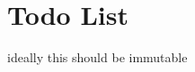 \chapter{Todo List}
\hypertarget{todo}{}\label{todo}

\begin{DoxyRefList}
\item[Struct \doxylink{structNeoN_1_1la_1_1SparsityView}{NeoN\+::la\+::Sparsity\+View\texorpdfstring{$<$}{<} Index\+Type \texorpdfstring{$>$}{>}} ]\label{todo__todo000001}%
%
ideally this should be immutable 
\end{DoxyRefList}